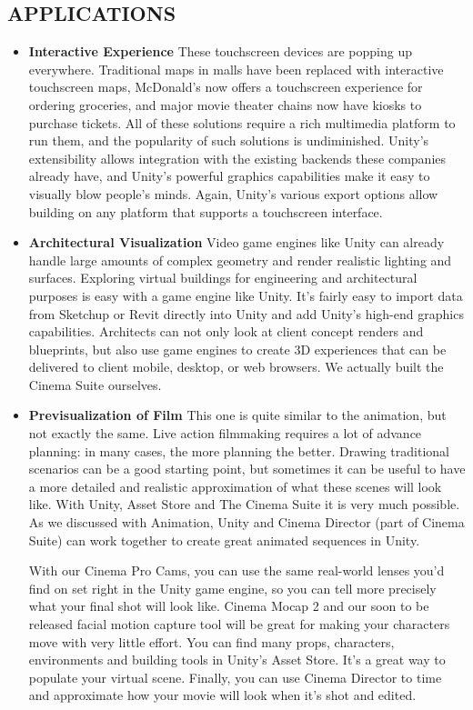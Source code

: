 \documentclass[12pt]{report}
\begin{document}
\subsection{APPLICATIONS}
\begin{itemize}
    \item \textbf{Interactive Experience}
        These touchscreen devices are popping up everywhere. Traditional maps in malls have been replaced with interactive touchscreen maps, McDonald's now offers a touchscreen experience for ordering groceries, and major movie theater chains now have kiosks to purchase tickets. All of these solutions require a rich multimedia platform to run them, and the popularity of such solutions is undiminished. Unity's extensibility allows integration with the existing backends these companies already have, and Unity's powerful graphics capabilities make it easy to visually blow people's minds. Again, Unity's various export options allow building on any platform that supports a touchscreen interface.
    \item \textbf{Architectural Visualization}
        Video game engines like Unity can already handle large amounts of complex geometry and render realistic lighting and surfaces. Exploring virtual buildings for engineering and architectural purposes is easy with a game engine like Unity. It's fairly easy to import data from Sketchup or Revit directly into Unity and add Unity's high-end graphics capabilities. Architects can not only look at client concept renders and blueprints, but also use game engines to create 3D experiences that can be delivered to client mobile, desktop, or web browsers. We actually built the Cinema Suite ourselves.
    \item \textbf{Previsualization of Film}
    This one is quite similar to the animation, but not exactly the same. Live action filmmaking requires a lot of advance planning: in many cases, the more planning the better. Drawing traditional scenarios can be a good starting point, but sometimes it can be useful to have a more detailed and realistic approximation of what these scenes will look like. With Unity, Asset Store and The Cinema Suite it is very much possible. As we discussed with Animation, Unity and Cinema Director (part of Cinema Suite) can work together to create great animated sequences in Unity.

    With our Cinema Pro Cams, you can use the same real-world lenses you'd find on set right in the Unity game engine, so you can tell more precisely what your final shot will look like. Cinema Mocap 2 and our soon to be released facial motion capture tool will be great for making your characters move with very little effort. You can find many props, characters, environments and building tools in Unity's Asset Store. It's a great way to populate your virtual scene. Finally, you can use Cinema Director to time and approximate how your movie will look when it's shot and edited.
    
\end{itemize}
\end{document}
